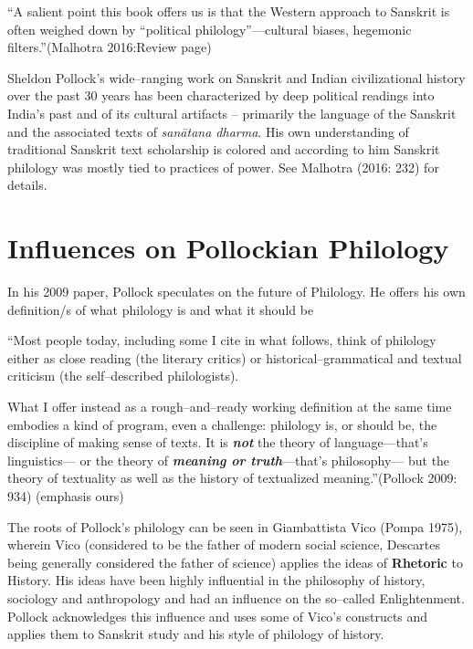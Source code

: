 \begin{myquote}
“A salient point this book offers us is that the Western approach to Sanskrit is often weighed down by “political philology”—cultural biases, hegemonic filters.”\hfill (Malhotra 2016:Review page)
\end{myquote}

Sheldon Pollock’s wide–ranging work on Sanskrit and Indian civilizational history over the past 30 years has been characterized by deep political readings into India’s past and of its cultural artifacts – primarily the language of the Sanskrit and the associated texts of \textit{sanātana dharma}. His own understanding of traditional Sanskrit text scholarship is colored and according to him Sanskrit philology was mostly tied to practices of power. See Malhotra (2016: 232) for details.


\section*{Influences on Pollockian Philology}

In his 2009 paper, Pollock speculates on the future of Philology. He offers his own definition/s of what philology is and what it should be

\begin{myquote}
“Most people today, including some I cite in what follows, think of philology either as close reading (the literary critics) or historical–grammatical and textual criticism (the self–described philologists).
\end{myquote}

\begin{myquote}
What I offer instead as a rough–and–ready working definition at the same time embodies a kind of program, even a challenge: philology is, or should be, the discipline of making sense of texts. It is \textbf{\textit{not}} the theory of language—that’s linguistics— or the theory of \textbf{\textit{meaning or truth}}—that’s philosophy— but the theory of textuality as well as the history of textualized meaning.”\hfill (Pollock 2009: 934) (emphasis ours)
\end{myquote}

The roots of Pollock’s philology can be seen in Giambattista Vico (Pompa 1975), wherein Vico (considered to be the father of modern social science, Descartes being generally considered the father of science) applies the ideas of \textbf{Rhetoric} to History. His ideas have been highly influential in the philosophy of history, sociology and anthropology and had an influence on the so–called Enlightenment. Pollock acknowledges this influence and uses some of Vico’s constructs and applies them to Sanskrit study and his style of philology of history.

